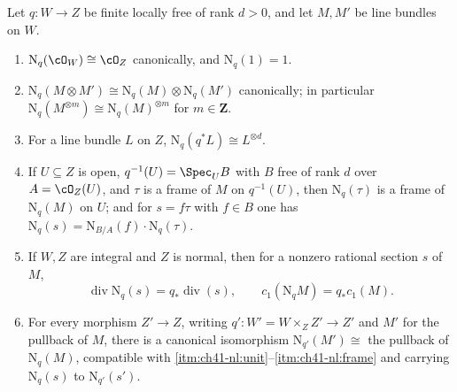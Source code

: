 \begin{proposition}
\label{prop:ch41-norm-line-properties}
Let $q:W\to Z$ be finite locally free of rank $d>0$, and let $M,M'$ be
line bundles on $W$.
\begin{enumerate}
\item\label{itm:ch41-nl:unit}
      $\mathrm N_q(\cO_W)\cong\cO_Z$ canonically, and
      $\mathrm N_q(1)=1$.
\item\label{itm:ch41-nl:mult}
      $\mathrm N_q(M\otimes M')\cong\mathrm N_q(M)\otimes\mathrm N_q(M')$
      canonically; in particular
      $\mathrm N_q(M^{\otimes m})\cong\mathrm N_q(M)^{\otimes m}$ for
      $m\in\mathbf Z$.
\item\label{itm:ch41-nl:pullback}
      For a line bundle $L$ on $Z$,
      $\mathrm N_q(q^*L)\cong L^{\otimes d}$.
\item\label{itm:ch41-nl:frame}
      If $U\subseteq Z$ is open, $q^{-1}(U)=\Spec_UB$ with $B$ free
      of rank $d$ over $A=\cO_Z(U)$, and $\tau$ is a frame of $M$
      on $q^{-1}(U)$, then $\mathrm N_q(\tau)$ is a frame of
      $\mathrm N_q(M)$ on $U$; and for
      $s=f\tau$ with $f\in B$ one has
      $\mathrm N_q(s)=\mathrm N_{B/A}(f)\cdot\mathrm N_q(\tau)$.
\item\label{itm:ch41-nl:divisor}
      If $W,Z$ are integral and $Z$ is normal, then for a nonzero
      rational section $s$ of $M$,
      \[
       \operatorname{div}\mathrm N_q(s)=q_*\operatorname{div}(s),
       \qquad
       c_1(\mathrm N_qM)=q_*c_1(M).
      \]
\item\label{itm:ch41-nl:bc}
      For every morphism $Z'\to Z$, writing $q':W'=W\times_ZZ'\to Z'$
      and $M'$ for the pullback of $M$, there is a canonical
      isomorphism $\mathrm N_{q'}(M')\cong$ the pullback of
      $\mathrm N_q(M)$, compatible with
      \cref{itm:ch41-nl:unit}--\cref{itm:ch41-nl:frame} and carrying
      $\mathrm N_q(s)$ to $\mathrm N_{q'}(s')$.
\end{enumerate}
\end{proposition}

